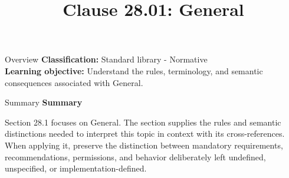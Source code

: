 \documentclass[10pt,letterpaper]{article}
\title{Clause 28.01: General}
\author{}
\date{}
\begin{document}
\maketitle
\begin{CornellOverviewBox}{Overview}
\textbf{Classification:} Standard library - Normative\\[2pt]
\textbf{Learning objective:} Understand the rules, terminology, and semantic consequences associated with General.
\end{CornellOverviewBox}\begin{CornellSummaryBox}{Summary}
{\sffamily\bfseries\color{Accent} Summary}\par\vspace{3pt}Section 28.1 focuses on General. The section supplies the rules and semantic distinctions needed to interpret this topic in context with its cross-references. When applying it, preserve the distinction between mandatory requirements, recommendations, permissions, and behavior deliberately left undefined, unspecified, or implementation-defined.
\end{CornellSummaryBox}
\end{document}
